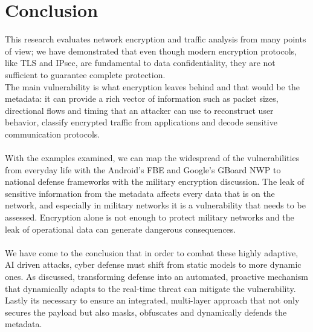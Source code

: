 \section{Conclusion}
This research evaluates network encryption and traffic analysis from many points of view; we have demonstrated that even though modern encryption protocols, like TLS and IPsec, are fundamental to data confidentiality, they are not sufficient to guarantee complete protection. 
\\The main vulnerability is what encryption leaves behind and that would be the metadata: it can provide a rich vector of information such as packet sizes, directional flows and timing that an attacker can use to reconstruct user behavior, classify encrypted traffic from applications and decode sensitive communication protocols.
\\\\With the examples examined, we can map the widespread of the vulnerabilities from everyday life with the Android's FBE and Google's GBoard NWP to national defense frameworks with the military encryption discussion. The leak of sensitive information from the metadata affects every data that is on the network, and especially in military networks it is a vulnerability that needs to be assessed. 
Encryption alone is not enough to protect military networks and the leak of operational data can generate dangerous consequences.
\\\\We have come to the conclusion that in order to combat these highly adaptive, AI driven attacks, cyber defense must shift from static models to more dynamic ones. 
As discussed, transforming defense into an automated, proactive mechanism that dynamically adapts to the real-time threat can mitigate the vulnerability.
Lastly its necessary to ensure an integrated, multi-layer approach that not only secures the payload but also masks, obfuscates and dynamically defends the metadata.